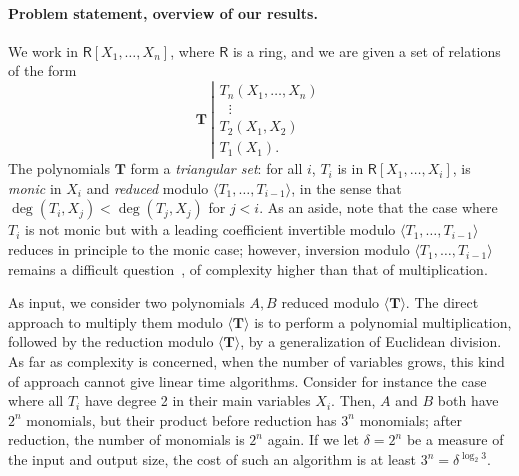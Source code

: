 \documentclass[amsthm]{elsart}
\def\T {\ensuremath{\mathbf{T}}}
\def\rng {\ensuremath{\mathsf{R}}}
\theoremstyle{plain}
\begin{document}
\paragraph*{Problem statement, overview of our results.}
We work in $\rng[X_1,\dots,X_n]$, where $\rng$ is a ring, and we are
given a set of relations of the form
$$\T~\left | \begin{array}{l}
T_n(X_1,\dots,X_n)\\
~~~\vdots\\
T_2(X_1,X_2)\\
T_1(X_1).
\end{array}\right .$$
The polynomials $\T$ form a {\em triangular set}: for all $i$, $T_i$
is in $\rng[X_1,\dots,X_i]$, is {\em monic} in $X_i$ and {\em reduced}
modulo $ \langle T_1,\dots,T_{i-1} \rangle$, in the sense that
$\deg(T_i,X_j) < \deg(T_j,X_j)$ for $j < i$. As an aside, note that
the case where $T_i$ is not monic but with a leading coefficient
invertible modulo $\langle T_1,\dots,T_{i-1} \rangle$ reduces in
principle to the monic case; however, inversion modulo $\langle
T_1,\dots,T_{i-1} \rangle$ remains a difficult
question~\cite{DaMoScXi06}, of complexity higher than that of
multiplication.

As input, we consider two polynomials $A,B$ reduced modulo $\langle
\T\rangle$. The direct approach to multiply them modulo $\langle
\T\rangle$ is to perform a polynomial multiplication, followed by the
reduction modulo $\langle \T\rangle$, by a generalization of Euclidean
division. As far as complexity is concerned, when the number of
variables grows, this kind of approach cannot give linear time
algorithms. Consider for instance the case where all $T_i$ have degree
2 in their main variables $X_i$. Then, $A$ and $B$ both have $2^n$
monomials, but their product before reduction has $3^n$ monomials;
after reduction, the number of monomials is $2^n$ again.  If we let
$\delta=2^n$ be a measure of the input and output size, the cost of
such an algorithm is at least $3^n=\delta^{\log_2 3}$.
\end{document}
